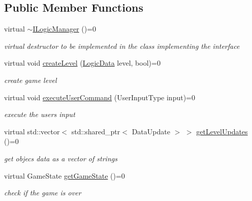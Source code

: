 \subsection*{Public Member Functions}
\begin{DoxyCompactItemize}
\item 
\mbox{\label{class_i_logic_manager_af522c957cdce66d34eb8264212b413ed}} 
virtual \mbox{\hyperlink{class_i_logic_manager_af522c957cdce66d34eb8264212b413ed}{$\sim$\+I\+Logic\+Manager}} ()=0
\begin{DoxyCompactList}\small\item\em virtual destructor to be implemented in the class implementing the interface \end{DoxyCompactList}\item 
\mbox{\label{class_i_logic_manager_a9d09e24fdfa312e3a908c0110e305ed5}} 
virtual void \mbox{\hyperlink{class_i_logic_manager_a9d09e24fdfa312e3a908c0110e305ed5}{create\+Level}} (\mbox{\hyperlink{class_logic_data}{Logic\+Data}} level, bool)=0
\begin{DoxyCompactList}\small\item\em create game level \end{DoxyCompactList}\item 
\mbox{\label{class_i_logic_manager_a531478a93285f5cdf6f22294638b27b3}} 
virtual void \mbox{\hyperlink{class_i_logic_manager_a531478a93285f5cdf6f22294638b27b3}{execute\+User\+Command}} (User\+Input\+Type input)=0
\begin{DoxyCompactList}\small\item\em execute the users input \end{DoxyCompactList}\item 
\mbox{\label{class_i_logic_manager_a9b783cc9ee7960b67d66549d77c601b5}} 
virtual std\+::vector$<$ std\+::shared\+\_\+ptr$<$ Data\+Update $>$ $>$ \mbox{\hyperlink{class_i_logic_manager_a9b783cc9ee7960b67d66549d77c601b5}{get\+Level\+Updates}} ()=0
\begin{DoxyCompactList}\small\item\em get objec\textquotesingle{}s data as a vector of strings \end{DoxyCompactList}\item 
\mbox{\label{class_i_logic_manager_a2e7dcfd57979507839aa885d6de2889a}} 
virtual Game\+State \mbox{\hyperlink{class_i_logic_manager_a2e7dcfd57979507839aa885d6de2889a}{get\+Game\+State}} ()=0
\begin{DoxyCompactList}\small\item\em check if the game is over \end{DoxyCompactList}\end{DoxyCompactItemize}


